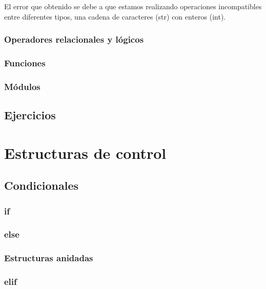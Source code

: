 \documentclass[letterpaper,10pt,spanish]{sphinxmanual}
\begin{document}
El error que obtenido se debe a que estamos realizando operaciones
incompatibles entre diferentes tipos, una cadena de caracteres (str) con
enteros (int).


\subsection{Operadores relacionales y lógicos}
\label{Unidad01:operadores-relacionales-y-logicos}

\subsection{Funciones}
\label{Unidad01:funciones}

\subsection{Módulos}
\label{Unidad01:modulos}

\section{Ejercicios}
\label{Unidad01:ejercicios}

\chapter{Estructuras de control}
\label{Unidad02::doc}\label{Unidad02:estructuras-de-control}

\section{Condicionales}
\label{Unidad02:condicionales}

\subsection{if}
\label{Unidad02:if}

\subsection{else}
\label{Unidad02:else}

\subsection{Estructuras anidadas}
\label{Unidad02:estructuras-anidadas}

\subsection{elif}
\label{Unidad02:elif}
\end{document}
